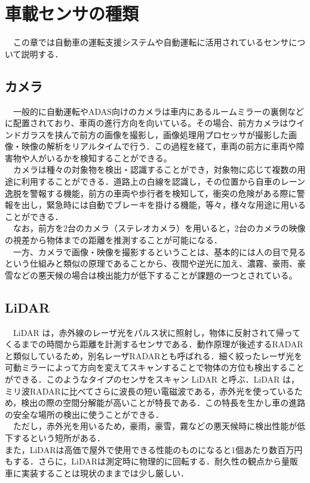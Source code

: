 \chapter{車載センサの種類}
　この章では自動車の運転支援システムや自動運転に活用されているセンサについて説明する．
\section{カメラ}
　一般的に自動運転やADAS向けのカメラは車内にあるルームミラーの裏側などに配置されており、車両の進行方向を向いている。その場合、前方カメラはウインドガラスを挟んで前方の画像を撮影し，画像処理用プロセッサが撮影した画像・映像の解析をリアルタイムで行う．この過程を経て，車両の前方に車両や障害物や人がいるかを検知することができる。\cite{jidountenlab_sensor}\\
　カメラは種々の対象物を検出・認識することができ，対象物に応じて複数の用途に利用することができる．道路上の白線を認識し，その位置から自車のレーン逸脱を警報する機能，前方の車両や歩行者を検知して，衝突の危険がある際に警報を出し，緊急時には自動でブレーキを掛ける機能，等々，様々な用途に用いることができる．\\
　なお，前方を2台のカメラ（ステレオカメラ）を用いると，2台のカメラの映像の視差から物体までの距離を推測することが可能になる．\cite{denso_sensor}\\
　一方、カメラで画像・映像を撮影するということは、基本的には人の目で見るという仕組みと類似の原理であることから、夜間や逆光に加え、濃霧、豪雨、豪雪などの悪天候の場合は検出能力が低下することが課題の一つとされている。\cite{jidountenlab_sensor}\\

\section{LiDAR}
　LiDAR は，赤外線のレーザ光をパルス状に照射し，物体に反射されて帰ってくるまでの時間から距離を計測するセンサである．動作原理が後述するRADARと類似しているため，別名レーザRADARとも呼ばれる．細く絞ったレーザ光を可動ミラーによって方向を変えてスキャンすることで物体の方位も検出することができる．このようなタイプのセンサをスキャン LiDAR と呼ぶ．LiDAR は，ミリ波RADARに比べてさらに波長の短い電磁波である，赤外光を使っているため，検出の際の空間分解能が高いことが特長である．この特長を生かし車の進路の安全な場所の検出に使うことができる．\\
　ただし，赤外光を用いるため，豪雨，豪雪，霧などの悪天候時に検出性能が低下するという短所がある．\cite{denso_sensor}\\また，LiDARは高価で屋外で使用できる性能のものになると1個あたり数百万円もする．さらに，LiDARは測定時に物理的に回転する．耐久性の観点から量販車に実装することは現状のままでは少し厳しい．\cite{MITTechnologyReview_sensor}


